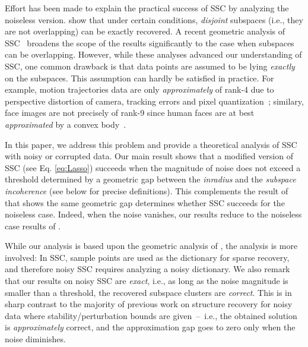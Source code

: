 \documentclass[twoside,11pt]{article}
\numberwithin{equation}{section}
\begin{document}
Effort has been made to explain the practical success of SSC by analyzing the noiseless version. \citet{elhamifar2010ssc_icassp} show that under certain conditions, \emph{disjoint} subspaces (i.e., they are not overlapping) can be exactly recovered.
A recent geometric analysis of SSC~\citep{soltanolkotabi2011geometric} broadens the scope of the results significantly to the case when subspaces can be overlapping. However, while these analyses advanced our understanding of SSC, one common drawback
is that data points are assumed to be lying {\em exactly} on the subspaces. This assumption can hardly be satisfied in practice. For example, motion trajectories data are only {\em approximately} of rank-4 due to perspective distortion of camera, tracking errors and pixel quantization~\citep{costeira1998motion_seg}; similary, face images are   not precisely of rank-9 since human faces are at best {\em approximated} by a convex body~\citep{basri2003lambertianface}.

In this paper, we address this problem and provide a theoretical analysis of SSC with noisy or corrupted data. Our main result shows that a modified version of SSC (see Eq. \eqref{eq:Lasso}) succeeds when the magnitude of noise does not exceed a threshold determined by a geometric gap between the \emph{inradius} and the \emph{subspace incoherence} (see below for precise definitions). This complements the result of \citet{soltanolkotabi2011geometric} that shows the same geometric gap determines whether SSC succeeds for the noiseless case. Indeed,  when the noise vanishes, our results reduce to the noiseless case results of \citeauthor{soltanolkotabi2011geometric}.

While our analysis is based upon the geometric analysis of \citet{soltanolkotabi2011geometric}, the analysis is more involved: In SSC, sample points are used as the dictionary for sparse recovery, and therefore noisy SSC requires analyzing a noisy dictionary.
We also remark that our results on noisy SSC are {\em exact}, i.e., as long as the noise magnitude is smaller than a threshold, the recovered subspace clusters are {\em correct}.
This is in sharp contrast to the majority of previous work on structure recovery for noisy data where stability/perturbation bounds are given~--~i.e., the obtained solution is {\em approximately} correct, and the approximation gap goes to zero only when the noise diminishes.
\end{document}
